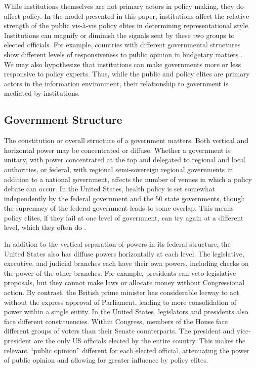While institutions themselves are not primary actors in policy making, they do affect policy. In the model presented in this paper, institutions affect the relative strength of the public vis-\`{a}-vis policy elites in determining representational style. Institutions can magnify or diminish the signals sent by these two groups to elected officials. For example, countries with different governmental structures show different levels of responsiveness to public opinion in budgetary matters \citep{Soroka2010}. We may also hypothesize that institutions can make governments more or less responsive to policy experts. Thus, while the public and policy elites are primary actors in the information environment, their relationship to government is mediated by institutions.

\subsection*{Government Structure}
The constitution or overall structure of a government matters. Both vertical and horizontal power may be concentrated or diffuse. Whether a government is unitary, with power concentrated at the top and delegated to regional and local authorities, or federal, with regional semi-sovereign regional governments in addition to a national government, affects the number of venues in which a policy debate can occur. In the United States, health policy is set somewhat independently by the federal government and the 50 state governments, though the supremacy of the federal government leads to some overlap. This means policy elites, if they fail at one level of government, can try again at a different level, which they often do \citep{Smith2002,Weissert2008}.

In addition to the vertical separation of powers in its federal structure, the United States also has diffuse powers horizontally at each level. The legislative, executive, and judicial branches each have their own powers, including checks on the power of the other branches. For example, presidents can veto legislative proposals, but they cannot make laws or allocate money without Congressional action. By contrast, the British prime minister has considerable leeway to act without the express approval of Parliament, leading to more consolidation of power within a single entity. In the United States, legislators and presidents also face different constituencies. Within Congress, members of the House face different groups of voters than their Senate counterparts. The president and vice-president are the only US officials elected by the entire country. This makes the relevant ``public opinion'' different for each elected official, attenuating the power of public opinion and allowing for greater influence by policy elites.

